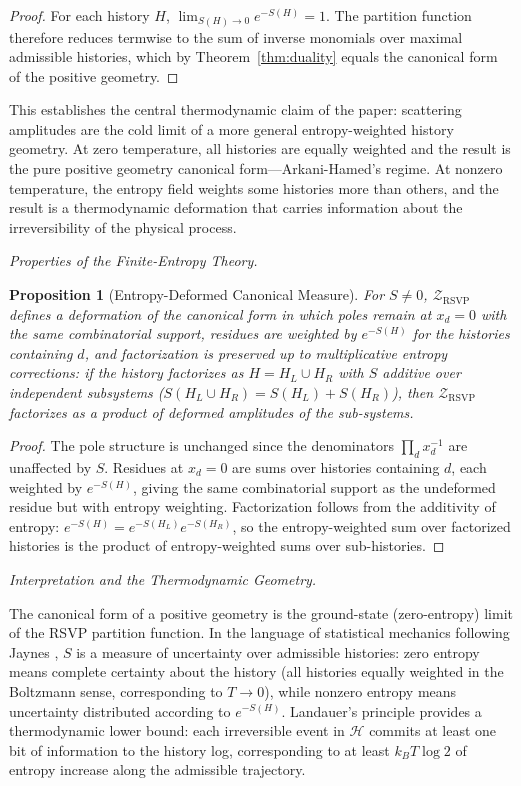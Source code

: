 \documentclass[12pt, oneside]{amsart}
\theoremstyle{plain}
\newtheorem{proposition}[theorem]{Proposition}
\theoremstyle{definition}
\theoremstyle{remark}
\newcommand{\Sf}{S}
\newcommand{\HKS}{\mathcal{H}}
\newcommand{\ZRSVP}{\mathcal{Z}_{\mathrm{RSVP}}}
\begin{document}
\begin{proof}
For each history $H$, $\lim_{\Sf(H) \to 0} e^{-\Sf(H)} = 1$. The partition function therefore reduces termwise to the sum of inverse monomials over maximal admissible histories, which by Theorem~\ref{thm:duality} equals the canonical form of the positive geometry.
\end{proof}

This establishes the central thermodynamic claim of the paper: scattering amplitudes are the cold limit of a more general entropy-weighted history geometry. At zero temperature, all histories are equally weighted and the result is the pure positive geometry canonical form---Arkani-Hamed's regime. At nonzero temperature, the entropy field weights some histories more than others, and the result is a thermodynamic deformation that carries information about the irreversibility of the physical process.

\medskip\noindent\textit{Properties of the Finite-Entropy Theory.}

\begin{proposition}[Entropy-Deformed Canonical Measure]
For $\Sf \neq 0$, $\ZRSVP$ defines a deformation of the canonical form in which poles remain at $x_d = 0$ with the same combinatorial support, residues are weighted by $e^{-\Sf(H)}$ for the histories containing $d$, and factorization is preserved up to multiplicative entropy corrections: if the history factorizes as $H = H_L \cup H_R$ with $\Sf$ additive over independent subsystems ($\Sf(H_L \cup H_R) = \Sf(H_L) + \Sf(H_R)$), then $\ZRSVP$ factorizes as a product of deformed amplitudes of the sub-systems.
\end{proposition}

\begin{proof}
The pole structure is unchanged since the denominators $\prod_d x_d^{-1}$ are unaffected by $\Sf$. Residues at $x_d = 0$ are sums over histories containing $d$, each weighted by $e^{-\Sf(H)}$, giving the same combinatorial support as the undeformed residue but with entropy weighting. Factorization follows from the additivity of entropy: $e^{-\Sf(H)} = e^{-\Sf(H_L)} e^{-\Sf(H_R)}$, so the entropy-weighted sum over factorized histories is the product of entropy-weighted sums over sub-histories.
\end{proof}

\medskip\noindent\textit{Interpretation and the Thermodynamic Geometry.}

The canonical form of a positive geometry is the ground-state (zero-entropy) limit of the RSVP partition function. In the language of statistical mechanics following Jaynes \cite{Jaynes1957}, $\Sf$ is a measure of uncertainty over admissible histories: zero entropy means complete certainty about the history (all histories equally weighted in the Boltzmann sense, corresponding to $T \to 0$), while nonzero entropy means uncertainty distributed according to $e^{-\Sf(H)}$. Landauer's principle \cite{Landauer1961} provides a thermodynamic lower bound: each irreversible event in $\HKS$ commits at least one bit of information to the history log, corresponding to at least $k_B T \log 2$ of entropy increase along the admissible trajectory.
\end{document}
